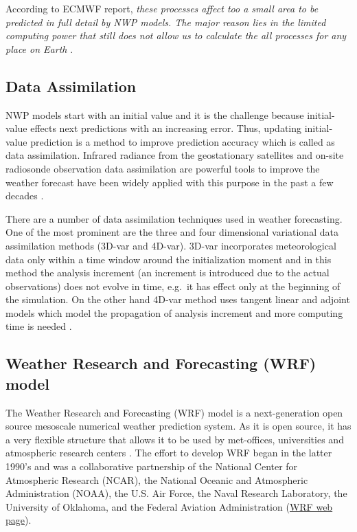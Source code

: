 \documentclass[
  letterpaper,
  DIV=11,
  numbers=noendperiod,
  abstract]{scrartcl}
\begin{document}
According to ECMWF report, \emph{these processes affect too a small area
to be predicted in full detail by NWP models. The major reason lies in
the limited computing power that still does not allow us to calculate
the all processes for any place on Earth} \autocite{frnda2022}.

\hypertarget{data-assimilation}{%
\subsection{Data Assimilation}\label{data-assimilation}}

NWP models start with an initial value and it is the challenge because
initial-value effects next predictions with an increasing error. Thus,
updating initial-value prediction is a method to improve prediction
accuracy which is called as data assimilation. Infrared radiance from
the geostationary satellites and on-site radiosonde observation data
assimilation are powerful tools to improve the weather forecast have
been widely applied with this purpose in the past a few decades
\autocite{geer2018}.

There are a number of data assimilation techniques used in weather
forecasting. One of the most prominent are the three and four
dimensional variational data assimilation methods (3D-var and 4D-var).
3D-var incorporates meteorological data only within a time window around
the initialization moment and in this method the analysis increment (an
increment is introduced due to the actual observations) does not evolve
in time, e.g.~it has effect only at the beginning of the simulation. On
the other hand 4D-var method uses tangent linear and adjoint models
which model the propagation of analysis increment and more computing
time is needed \autocite{vladimirov2020}.

\hypertarget{weather-research-and-forecasting-wrf-model}{%
\subsection{Weather Research and Forecasting (WRF)
model}\label{weather-research-and-forecasting-wrf-model}}

The Weather Research and Forecasting (WRF) model is a next-generation
open source mesoscale numerical weather prediction system. As it is open
source, it has a very flexible structure that allows it to be used by
met-offices, universities and atmospheric research centers
\autocite{powers2017}. The effort to develop WRF began in the latter
1990's and was a collaborative partnership of the National Center for
Atmospheric Research (NCAR), the National Oceanic and Atmospheric
Administration (NOAA), the U.S. Air Force, the Naval Research
Laboratory, the University of Oklahoma, and the Federal Aviation
Administration (\href{https://www.mmm.ucar.edu/models/wrf}{WRF web
page}).
\end{document}
